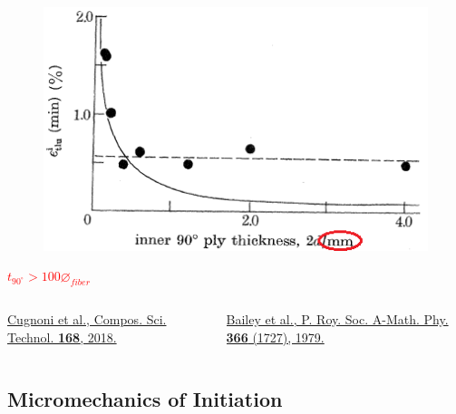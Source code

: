 \documentclass[first,firstsupp,lastsupp,last,hyperref,table]{ETHclass}
\begin{document}
\begin{frame}
\begin{columns}[c]
\begin{column}{0.5\textwidth}
\centering
\begin{figure}
\centering
\includegraphics[width=\columnwidth]{bailey-highlighted.png}
\end{figure}
\textcolor{red}{\tiny$t_{90^{\circ}}>100\diameter_{fiber}$}
\end{column}
\end{columns}
\vspace{0.15cm}
\begin{columns}[b]
\begin{column}{0.5\textwidth}
\centering
\pgfmathsetmacro{}
\pgfmathsetmacro{}
{\fontsize{\fontsizeref}{\stretchref} \selectfont \href{https://doi.org/10.1016/j.compscitech.2018.08.037}{Cugnoni et al., Compos. Sci. Technol. \textbf{168}, 2018.}}
\end{column}
\begin{column}{0.5\textwidth}
\centering
\pgfmathsetmacro{}
\pgfmathsetmacro{}
{\fontsize{\fontsizeref}{\stretchref} \selectfont \href{https://doi.org/10.1098/rspa.1979.0071}{Bailey et al., P. Roy. Soc. A-Math. Phy. \textbf{366} (1727), 1979.}}
\end{column}
\end{columns}
\end{frame}

\subsection{Micromechanics of Initiation}
\end{document}
